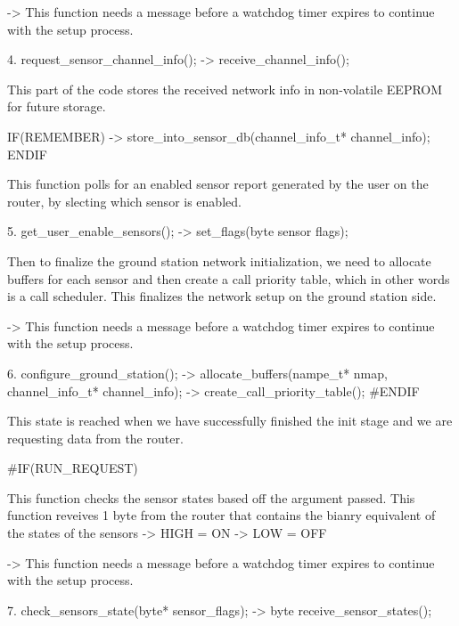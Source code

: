 \begin{DoxyVerb}
       -> This function needs a message before a watchdog timer expires
          to continue with the setup process.

     4. request_sensor_channel_info();
            -> receive_channel_info();


               This part of the code stores the received network info in
               non-volatile EEPROM for future storage.\

            IF(REMEMBER)
                -> store_into_sensor_db(channel_info_t* channel_info);
            ENDIF


       This function polls for an enabled sensor report generated by the
       user on the router, by slecting which sensor is enabled.

     5. get_user_enable_sensors();
            -> set_flags(byte sensor flags);


       Then to finalize the ground station network initialization,
       we need to allocate buffers for each sensor and then create a
       call priority table, which in other words is a call scheduler.
       This finalizes the network setup on the ground station side.

       -> This function needs a message before a watchdog timer expires
          to continue with the setup process.

     6. configure_ground_station();
            -> allocate_buffers(nampe_t* nmap, channel_info_t* channel_info);
            -> create_call_priority_table();
#ENDIF
\end{DoxyVerb}


This state is reached when we have successfully finished the init stage and we are requesting data from the router. \begin{DoxyVerb}#IF(RUN_REQUEST)


       This function checks the sensor states based off the argument passed.
       This function reveives 1 byte from the router that contains the
       bianry equivalent of the states of the sensors
        -> HIGH = ON
        -> LOW  = OFF

       -> This function needs a message before a watchdog timer expires
          to continue with the setup process.

     7. check_sensors_state(byte* sensor_flags);
        -> byte receive_sensor_states();
\end{DoxyVerb}


